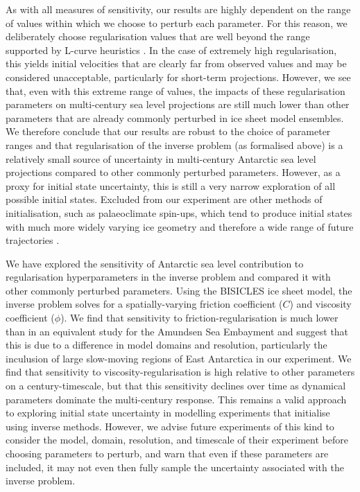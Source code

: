 \documentclass[journal abbreviation, manuscript]{copernicus}
\begin{document}
As with all measures of sensitivity, our results are highly dependent on the range of values within which we choose to perturb each parameter. For this reason, we deliberately choose regularisation values that are well beyond the range supported by L-curve heuristics \citep{wolovickRegularizationLcurvesIce2023}. In the case of extremely high regularisation, this yields initial velocities that are clearly far from observed values and may be considered unacceptable, particularly for short-term projections. However, we see that, even with this extreme range of values, the impacts of these regularisation parameters on multi-century sea level projections are still much lower than other parameters that are already commonly perturbed in ice sheet model ensembles. We therefore conclude that our results are robust to the choice of parameter ranges and that regularisation of the inverse problem (as formalised above) is a relatively small source of uncertainty in multi-century Antarctic sea level projections compared to other commonly perturbed parameters. However, as a proxy for initial state uncertainty, this is still a very narrow exploration of all possible initial states. Excluded from our experiment are other methods of initialisation, such as palaeoclimate spin-ups, which tend to produce initial states with much more widely varying ice geometry and therefore a wide range of future trajectories \citep{seroussiInitMIPAntarcticaIceSheet2019}.

\conclusions  %

We have explored the sensitivity of Antarctic sea level contribution to regularisation hyperparameters in the inverse problem and compared it with other commonly perturbed parameters. Using the BISICLES ice sheet model, the inverse problem solves for a spatially-varying friction coefficient ($C$) and viscosity coefficient ($\phi$). We find that sensitivity to friction-regularisation is much lower than in an equivalent study for the Amundsen Sea Embayment and suggest that this is due to a difference in model domains and resolution, particularly the inculusion of large slow-moving regions of East Antarctica in our experiment. We find that sensitivity to viscosity-regularisation is high relative to other parameters on a century-timescale, but that this sensitivity declines over time as dynamical parameters dominate the multi-century response. This remains a valid approach to exploring initial state uncertainty in modelling experiments that initialise using inverse methods. However, we advise future experiments of this kind to consider the model, domain, resolution, and timescale of their experiment before choosing parameters to perturb, and warn that even if these parameters are included, it may not even then fully sample the uncertainty associated with the inverse problem.
\end{document}
